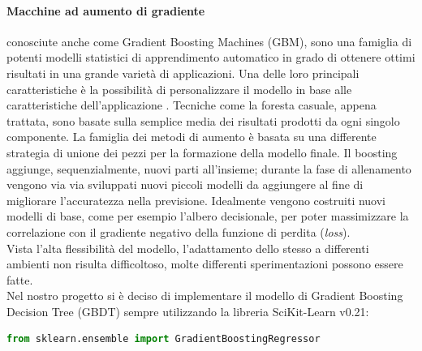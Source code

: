 \documentclass[%
    corpo=12pt,
    twoside,
    oldstyle,
    autoretitolo,
    greek,
    evenboxes,
]{toptesi}
\begin{document}
\paragraph{Macchine ad aumento di gradiente}
conosciute anche come Gradient Boosting Machines (GBM), sono una famiglia di potenti modelli statistici di apprendimento automatico in grado di ottenere ottimi risultati in una grande varietà di applicazioni. Una delle loro principali caratteristiche è la possibilità di personalizzare il modello in base alle caratteristiche dell'applicazione \cite{gbm}. Tecniche come la foresta casuale, appena trattata, sono basate sulla semplice media dei risultati prodotti da ogni singolo componente. La famiglia dei metodi di aumento è basata su una differente strategia di unione dei pezzi per la formazione della modello finale. Il boosting aggiunge, sequenzialmente, nuovi parti all'insieme; durante la fase di allenamento vengono via via sviluppati nuovi piccoli modelli da aggiungere al fine di migliorare l'accuratezza nella previsione. Idealmente vengono costruiti nuovi modelli di base, come per esempio l'albero decisionale, per poter massimizzare la correlazione con il gradiente negativo della funzione di perdita (\textit{loss}).\\
Vista l'alta flessibilità del modello, l'adattamento dello stesso a differenti ambienti non risulta difficoltoso, molte differenti sperimentazioni possono essere fatte.\\
Nel nostro progetto si è deciso di implementare il modello di Gradient Boosting Decision Tree (GBDT) sempre utilizzando la libreria SciKit-Learn v0.21:
\begin{lstlisting}[language=Python, frame=single]
  from sklearn.ensemble import GradientBoostingRegressor
\end{lstlisting}
\end{document}
